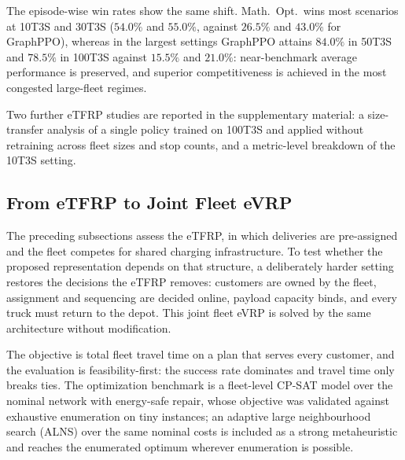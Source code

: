 \documentclass[journal]{IEEEtran}
\begin{document}
The episode-wise win rates show the same shift. Math.\ Opt.\ wins most scenarios at 10T3S and 30T3S ($54.0\%$ and $55.0\%$, against $26.5\%$ and $43.0\%$ for GraphPPO), whereas in the largest settings GraphPPO attains $84.0\%$ in 50T3S and $78.5\%$ in 100T3S against $15.5\%$ and $21.0\%$: near-benchmark average performance is preserved, and superior competitiveness is achieved in the most congested large-fleet regimes.




Two further eTFRP studies are reported in the supplementary material: a size-transfer analysis of a single policy trained on 100T3S and applied without retraining across fleet sizes and stop counts, and a metric-level breakdown of the 10T3S setting.

\subsection{From eTFRP to Joint Fleet eVRP}\label{sec:joint_evrp}

The preceding subsections assess the eTFRP, in which deliveries are pre-assigned and the fleet competes for shared charging infrastructure. To test whether the proposed representation depends on that structure, a deliberately harder setting restores the decisions the eTFRP removes: customers are owned by the fleet, assignment and sequencing are decided online, payload capacity binds, and every truck must return to the depot. This joint fleet eVRP is solved by the same architecture without modification.

 The objective is total fleet travel time on a plan that serves every customer, and the evaluation is feasibility-first: the success rate dominates and travel time only breaks ties. The optimization benchmark is a fleet-level CP-SAT model over the nominal network with energy-safe repair, whose objective was validated against exhaustive enumeration on tiny instances; an adaptive large neighbourhood search (ALNS) over the same nominal costs is included as a strong metaheuristic and reaches the enumerated optimum wherever enumeration is possible.
\end{document}
